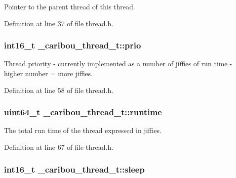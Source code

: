 Pointer to the parent thread of this thread. 



Definition at line 37 of file thread.\-h.

\hypertarget{struct__caribou__thread__t_a91f8936a0a3a5c21c4ffcbe1045c34ee}{
\subsubsection[{prio}]{\setlength{\rightskip}{0pt plus 5cm}int16\-\_\-t \-\_\-caribou\-\_\-thread\-\_\-t\-::prio}}\label{struct__caribou__thread__t_a91f8936a0a3a5c21c4ffcbe1045c34ee}


Thread priority -\/ currently implemented as a number of jiffies of run time -\/ higher number = more jiffies. 



Definition at line 58 of file thread.\-h.

\hypertarget{struct__caribou__thread__t_a942c87c4803e79dabc7fd0b5e24afb63}{
\subsubsection[{runtime}]{\setlength{\rightskip}{0pt plus 5cm}uint64\-\_\-t \-\_\-caribou\-\_\-thread\-\_\-t\-::runtime}}\label{struct__caribou__thread__t_a942c87c4803e79dabc7fd0b5e24afb63}


The total run time of the thread expressed in jiffies. 



Definition at line 67 of file thread.\-h.

\hypertarget{struct__caribou__thread__t_a4a4746a8fede65c362fb46c80469509f}{
\subsubsection[{sleep}]{\setlength{\rightskip}{0pt plus 5cm}int16\-\_\-t \-\_\-caribou\-\_\-thread\-\_\-t\-::sleep}}\label{struct__caribou__thread__t_a4a4746a8fede65c362fb46c80469509f}


